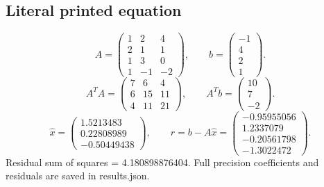 \documentclass[a4paper,11pt]{article}
\begin{document}
\subsection*{Literal printed equation}
\[A=\begin{pmatrix}1&2&4\\2&1&1\\1&3&0\\1&-1&-2\end{pmatrix},\qquad b=\begin{pmatrix}-1\\4\\2\\1\end{pmatrix}.\]
\[A^TA=\begin{pmatrix}7&6&4\\6&15&11\\4&11&21\end{pmatrix},\qquad A^Tb=\begin{pmatrix}10\\7\\-2\end{pmatrix}.\]
\[\widehat{x}=\begin{pmatrix}1.5213483\\0.22808989\\-0.50449438\end{pmatrix},\qquad r=b-A\widehat{x}=\begin{pmatrix}-0.95955056\\1.2337079\\-0.20561798\\-1.3022472\end{pmatrix}.\]
Residual sum of squares = 4.180898876404. Full precision coefficients and residuals are saved in results.json.
\end{document}
